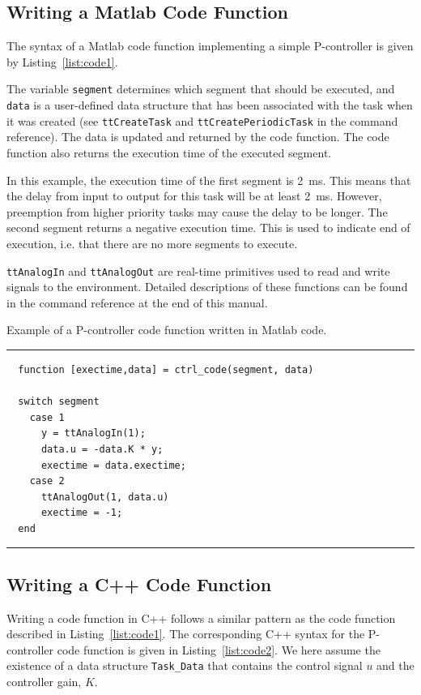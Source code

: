 \documentclass[final,twoside]{rapport}
\begin{document}
\subsection{Writing a Matlab Code Function}
\label{sec:mcode}
The syntax of a Matlab code function implementing a simple
P-controller is given by Listing~\ref{list:code1}.

The variable \texttt{segment} determines which segment that should be
executed, and \texttt{data} is a user-defined data structure that has
been associated with the task when it was created (see
\texttt{ttCreateTask} and \texttt{ttCreatePeriodicTask} in the command
reference). The data is updated and returned by the code function. The
code function also returns the execution time of the executed segment.

In this example, the execution time of the first segment is 2~ms. This
means that the delay from input to output for this task will be at
least 2~ms. However, preemption from higher priority tasks may cause
the delay to be longer. The second segment returns a negative
execution time. This is used to indicate end of execution, i.e. that
there are no more segments to execute.

\texttt{ttAnalogIn} and \texttt{ttAnalogOut} are real-time primitives
used to read and write signals to the environment. Detailed
descriptions of these functions can be found in the command reference
at the end of this manual.

\begin{listing}[b]\small
\caption{Example of a P-controller code function written in
  Matlab code.}
\label{list:code1}
\vspace{3mm}
\hrule
\begin{verbatim}
  function [exectime,data] = ctrl_code(segment, data)

  switch segment
    case 1
      y = ttAnalogIn(1);
      data.u = -data.K * y;
      exectime = data.exectime;
    case 2
      ttAnalogOut(1, data.u)
      exectime = -1;
  end
\end{verbatim}
\hrule
\end{listing}


\subsection{Writing a C++ Code Function}
Writing a code function in C++ follows a similar pattern as the code
function described in Listing~\ref{list:code1}. The corresponding C++
syntax for the P-controller code function is given in
Listing~\ref{list:code2}. We here assume the existence of a data
structure \texttt{Task\_Data} that contains the control signal $u$ and
the controller gain, $K$.
\end{document}
